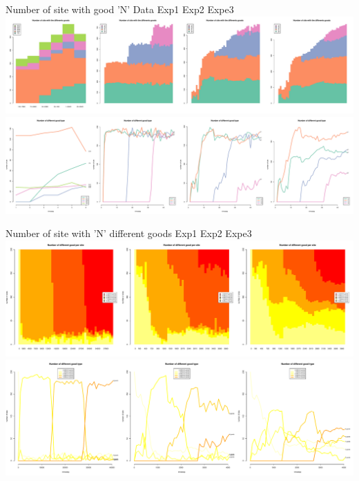 \documentclass[12pt, notes=show]{beamer}
\begin{document}
\begin{frame}{Number of site with good 'N'}
    \small
Data \hfill Exp1 \hfill Exp2 \hfill Expe3 
	\includegraphics[width=\textwidth]{../images/hmNbSiteWGoodN.pdf}\\
	\includegraphics[width=\textwidth]{../images/plotNbSiteWGoodN.pdf}\\
\end{frame}

\begin{frame}{Number of site with 'N' different goods}
    \centering
    \tiny
 Exp1 \hfill Exp2 \hfill Expe3 
	\includegraphics[width=.95\textwidth]{../images/hmNbGoodPerSite.pdf}\\
	\vfil
	\includegraphics[width=.95\textwidth]{../images/plotNbGoodPerSite.pdf}\\
\end{frame}
\end{document}
